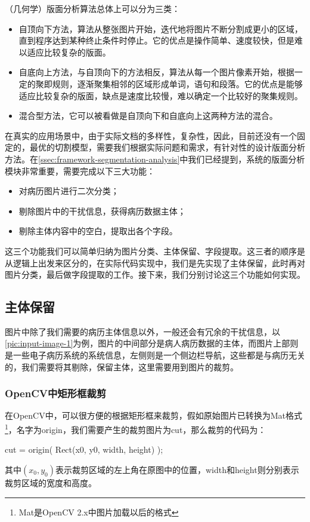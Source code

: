 （几何学）版面分析算法总体上可以分为三类\citep{mao2003document}：
\begin{itemize}
	\item 自顶向下方法，算法从整张图片开始，迭代地将图片不断分割成更小的区域，直到程序达到某种终止条件时停止。它的优点是操作简单、速度较快，但是难以适应比较复杂的版面\citep{nagy1992prototype}\citep{baird1990image}。
	\item 自底向上方法，与自顶向下的方法相反，算法从每一个图片像素开始，根据一定的聚即规则，逐渐聚集相邻的区域形成单词，语句和段落。它的优点是能够适应比较复杂的版面，缺点是速度比较慢，难以确定一个比较好的聚集规则\citep{o1993document}\citep{kise1998segmentation}。
	\item 混合型方法，它可以被看做是自顶向下和自底向上这两种方法的混合\citep{pavlidis1992page}。
\end{itemize}

在真实的应用场景中，由于实际文档的多样性，复杂性，因此，目前还没有一个固定的，最优的切割模型，需要我们根据实际问题和需求，有针对性的设计版面分析方法。在\autoref{ssec:framework-segmentation-analysis}中我们已经提到，系统的版面分析模块非常重要，需要完成以下三大功能：
\begin{itemize}
	\item 对病历图片进行二次分类；
	\item 剔除图片中的干扰信息，获得病历数据主体；
	\item 剔除主体内容中的空白，提取出各个字段。
\end{itemize}
这三个功能我们可以简单归纳为图片分类、主体保留、字段提取。这三者的顺序是从逻辑上出发来区分的，在实际代码实现中，我们是先实现了主体保留，此时再对图片分类，最后做字段提取的工作。接下来，我们分别讨论这三个功能如何实现。

\subsection{主体保留}
图片中除了我们需要的病历主体信息以外，一般还会有冗余的干扰信息，以\autoref{pic:input-image-1}为例，图片的中间部分是病人病历数据的主体，而图片上部则是一些电子病历系统的系统信息，左侧则是一个侧边栏导航，这些都是与病历无关的，我们需要将其剔除，保留主体，这里需要用到图片的裁剪。

\subsubsection*{OpenCV中矩形框裁剪}
在OpenCV中，可以很方便的根据矩形框来裁剪，假如原始图片已转换为Mat格式\footnote{Mat是OpenCV 2.x中图片加载以后的格式}，名字为origin，我们需要产生的裁剪图片为cut，那么裁剪的代码为：
\begin{Code}
cut = origin( Rect(x0, y0, width, height) );
\end{Code}
其中$(x_0,y_0)$表示裁剪区域的左上角在原图中的位置，width和height则分别表示裁剪区域的宽度和高度。

